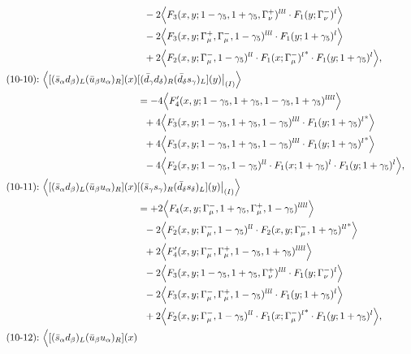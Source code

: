 \begin{align}
\notag\\*&\ \ 
-2\Big\langle F_3(x,y;1-\gamma_5,1+\gamma_5,\Gamma_\nu^+)^{lll} \cdot F_1(y;\Gamma_\nu^-)^l\Big\rangle
\notag\\*&\ \ 
-2\Big\langle F_3(x,y;\Gamma_\mu^+,\Gamma_\mu^-,1-\gamma_5)^{lll} \cdot F_1(y;1+\gamma_5)^l\Big\rangle
\notag\\*&\ \ 
 + 2\Big\langle F_2(x,y;\Gamma_\mu^-,1-\gamma_5)^{ll} \cdot {F_1(x;\Gamma_\mu^-)^l}^* \cdot F_1(y;1+\gamma_5)^l\Big\rangle,
\\
\mbox{(10-10):}\ 
\Big\langle
[(\bar s_\alpha d_\beta)_L(\bar u_\beta u_\alpha)_R](x)&
[(\bar d_\gamma d_\delta)_R(\bar d_\delta s_\gamma)_L](y)\big|_{(I)}
\Big\rangle
\notag\\*
&=
-4\Big\langle F_4'(x,y;1-\gamma_5,1+\gamma_5,1-\gamma_5,1+\gamma_5)^{llll}\Big\rangle
\notag\\*&\ \ 
 + 4\Big\langle F_3(x,y;1-\gamma_5,1+\gamma_5,1-\gamma_5)^{lll} \cdot {F_1(y;1+\gamma_5)^l}^*\Big\rangle
\notag\\*&\ \ 
 + 4\Big\langle F_3(x,y;1-\gamma_5,1+\gamma_5,1-\gamma_5)^{lll} \cdot {F_1(y;1+\gamma_5)^l}^*\Big\rangle
\notag\\*&\ \ 
-4\Big\langle F_2(x,y;1-\gamma_5,1-\gamma_5)^{ll} \cdot F_1(x;1+\gamma_5)^l \cdot F_1(y;1+\gamma_5)^l\Big\rangle,
\\
\mbox{(10-11):}\ 
\Big\langle
[(\bar s_\alpha d_\beta)_L(\bar u_\beta u_\alpha)_R](x)&
[(\bar s_\gamma s_\gamma)_R(\bar d_\delta s_\delta)_L](y)\big|_{(I)}
\Big\rangle
\notag\\*
&=
 + 2\Big\langle F_4(x,y;\Gamma_\mu^-,1+\gamma_5,\Gamma_\mu^+,1-\gamma_5)^{llll}\Big\rangle
\notag\\*&\ \ 
-2\Big\langle F_2(x,y;\Gamma_\mu^-,1-\gamma_5)^{ll} \cdot {F_2(x,y;\Gamma_\mu^-,1+\gamma_5)^{ll}}^*\Big\rangle
\notag\\*&\ \ 
 + 2\Big\langle F_4'(x,y;\Gamma_\mu^-,\Gamma_\mu^+,1-\gamma_5,1+\gamma_5)^{llll}\Big\rangle
\notag\\*&\ \ 
-2\Big\langle F_3(x,y;1-\gamma_5,1+\gamma_5,\Gamma_\nu^+)^{lll} \cdot F_1(y;\Gamma_\nu^-)^l\Big\rangle
\notag\\*&\ \ 
-2\Big\langle F_3(x,y;\Gamma_\mu^-,\Gamma_\mu^+,1-\gamma_5)^{lll} \cdot F_1(y;1+\gamma_5)^l\Big\rangle
\notag\\*&\ \ 
 + 2\Big\langle F_2(x,y;\Gamma_\mu^-,1-\gamma_5)^{ll} \cdot {F_1(x;\Gamma_\mu^-)^l}^* \cdot F_1(y;1+\gamma_5)^l\Big\rangle,
\\
\mbox{(10-12):}\ 
\Big\langle
[(\bar s_\alpha d_\beta)_L(\bar u_\beta u_\alpha)_R](x)&

\end{align}
